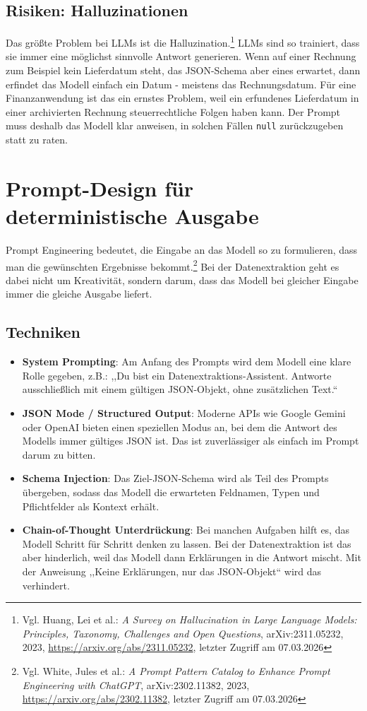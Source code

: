 \subsection{Risiken: Halluzinationen}
Das größte Problem bei LLMs ist die Halluzination.\footnote{Vgl. Huang, Lei et al.: \textit{A Survey on Hallucination in Large Language Models: Principles, Taxonomy, Challenges and Open Questions}, arXiv:2311.05232, 2023, \url{https://arxiv.org/abs/2311.05232}, letzter Zugriff am 07.03.2026} LLMs sind so trainiert, dass sie immer eine möglichst sinnvolle Antwort generieren. Wenn auf einer Rechnung zum Beispiel kein Lieferdatum steht, das JSON-Schema aber eines erwartet, dann erfindet das Modell einfach ein Datum - meistens das Rechnungsdatum.
Für eine Finanzanwendung ist das ein ernstes Problem, weil ein erfundenes Lieferdatum in einer archivierten Rechnung steuerrechtliche Folgen haben kann. Der Prompt muss deshalb das Modell klar anweisen, in solchen Fällen \texttt{null} zurückzugeben statt zu raten.

\section{Prompt-Design für deterministische Ausgabe}
\label{sec:prompt_design}

Prompt Engineering bedeutet, die Eingabe an das Modell so zu formulieren, dass man die gewünschten Ergebnisse bekommt.\footnote{Vgl. White, Jules et al.: \textit{A Prompt Pattern Catalog to Enhance Prompt Engineering with ChatGPT}, arXiv:2302.11382, 2023, \url{https://arxiv.org/abs/2302.11382}, letzter Zugriff am 07.03.2026} Bei der Datenextraktion geht es dabei nicht um Kreativität, sondern darum, dass das Modell bei gleicher Eingabe immer die gleiche Ausgabe liefert.

\subsection{Techniken}
\begin{itemize}
    \item \textbf{System Prompting}: Am Anfang des Prompts wird dem Modell eine klare Rolle gegeben, z.B.: ,,Du bist ein Datenextraktions-Assistent. Antworte ausschließlich mit einem gültigen JSON-Objekt, ohne zusätzlichen Text.``
    \item \textbf{JSON Mode / Structured Output}: Moderne APIs wie Google Gemini oder OpenAI bieten einen speziellen Modus an, bei dem die Antwort des Modells immer gültiges JSON ist. Das ist zuverlässiger als einfach im Prompt darum zu bitten.
    \item \textbf{Schema Injection}: Das Ziel-JSON-Schema wird als Teil des Prompts übergeben, sodass das Modell die erwarteten Feldnamen, Typen und Pflichtfelder als Kontext erhält.
    \item \textbf{Chain-of-Thought Unterdrückung}: Bei manchen Aufgaben hilft es, das Modell Schritt für Schritt denken zu lassen. Bei der Datenextraktion ist das aber hinderlich, weil das Modell dann Erklärungen in die Antwort mischt. Mit der Anweisung ,,Keine Erklärungen, nur das JSON-Objekt`` wird das verhindert.
\end{itemize}

